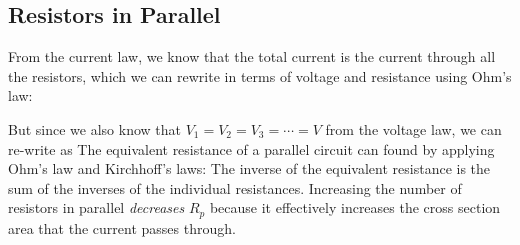 \subsection{Resistors in Parallel}

\begin{figure}[ht]
  \centering
\end{figure}
From the current law, we know that the total current is the current through all
the resistors, which we can rewrite in terms of voltage and resistance using
Ohm's law:
%
    
But since we also know that $V_1=V_2=V_3=\cdots=V$ from the voltage law, we
can re-write as
%
The equivalent resistance of a parallel circuit can found by applying Ohm's law
and Kirchhoff's laws: The inverse of the equivalent resistance is the sum of
the inverses of the individual resistances.
%
Increasing the number of resistors in parallel \emph{decreases} $R_p$ because
it effectively increases the cross section area that the current passes through.

